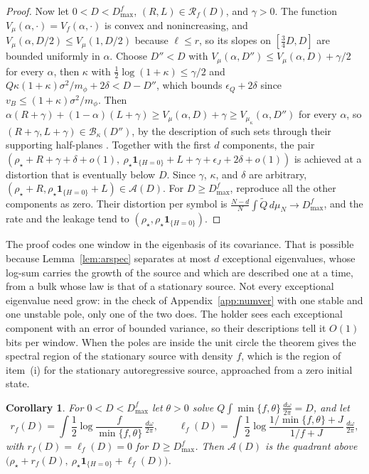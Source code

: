 \documentclass[11pt,onecolumn]{IEEEtran}
\newtheorem{corollary}[theorem]{Corollary}
\newcommand{\dw}{\tfrac{d\omega}{2\pi}}
\begin{document}
\begin{proof}
Now let $0<D<D_{\max}^f$, $(R,L)\in\mathcal R_f(D)$, and $\gamma>0$. The
function $V_\mu(\alpha,\cdot)=V_f(\alpha,\cdot)$ is convex and
nonincreasing, and $V_\mu(\alpha,D/2)\le V_\mu(1,D/2)$ because
$\ell\le r$, so its slopes on $[\tfrac34D,D]$ are bounded uniformly in
$\alpha$. Choose $D''<D$ with $V_\mu(\alpha,D'')\le V_\mu(\alpha,D)+\gamma/2$
for every $\alpha$, then $\kappa$ with $\tfrac12\log(1+\kappa)\le\gamma/2$
and $Q\kappa(1+\kappa)\sigma^2/m_\phi+2\delta<D-D''$, which bounds
$\epsilon_Q+2\delta$ since $v_B\le(1+\kappa)\sigma^2/m_\phi$. Then
$\alpha(R+\gamma)+(1-\alpha)(L+\gamma)\ge V_\mu(\alpha,D)+\gamma\ge V_{\mu_\kappa}(\alpha,D'')$
for every $\alpha$, so $(R+\gamma,L+\gamma)\in\mathcal B_\kappa(D'')$, by
the description of such sets through their supporting half-planes
\cite[proof of Theorem~16]{part2}. Together with the first $d$
components, the pair
$(\rho_\star+R+\gamma+\delta+o(1),\ \rho_\star\mathbf 1_{\{H=0\}}+L+\gamma+\epsilon_J+2\delta+o(1))$
is achieved at a distortion that is eventually below $D$. Since
$\gamma$, $\kappa$, and $\delta$ are arbitrary,
$(\rho_\star+R,\rho_\star\mathbf 1_{\{H=0\}}+L)\in\mathcal A(D)$. For
$D\ge D_{\max}^f$, reproduce all the other components as zero. Their
distortion per symbol is $\tfrac{N-d}N\int\tilde Q\,d\mu_N\to D_{\max}^f$,
and the rate and the leakage tend to $(\rho_\star,\rho_\star\mathbf 1_{\{H=0\}})$.
\end{proof}

The proof codes one window in the eigenbasis of its covariance. That is
possible because Lemma~\ref{lem:arspec} separates at most $d$
exceptional eigenvalues, whose log-sum carries the growth of the source
and which are described one at a time, from a bulk whose law is that
of a stationary source. Not every exceptional eigenvalue need grow: in
the check of Appendix~\ref{app:numver} with one stable and one unstable
pole, only one of the two does. The
holder sees each exceptional component with an error of bounded
variance, so their descriptions tell it $O(1)$ bits per window. When the poles are inside
the unit circle the theorem gives the spectral region of the stationary
source with density $f$, which is the region of item~(i) for the
stationary autoregressive source, approached from a zero initial state.

\begin{corollary}\label{cor:quadrant}
For $0<D<D_{\max}^f$ let $\theta>0$ solve $Q\int\min\{f,\theta\}\,\dw=D$,
and let
\[
r_f(D)=\int\frac12\log\frac f{\min\{f,\theta\}}\,\dw,\qquad
\ell_f(D)=\int\frac12\log\frac{1/\min\{f,\theta\}+J}{1/f+J}\,\dw,
\]
with $r_f(D)=\ell_f(D)=0$ for $D\ge D_{\max}^f$. Then $\mathcal A(D)$ is the
quadrant above
$\bigl(\rho_\star+r_f(D),\ \rho_\star\mathbf 1_{\{H=0\}}+\ell_f(D)\bigr)$.
\end{corollary}
\end{document}
